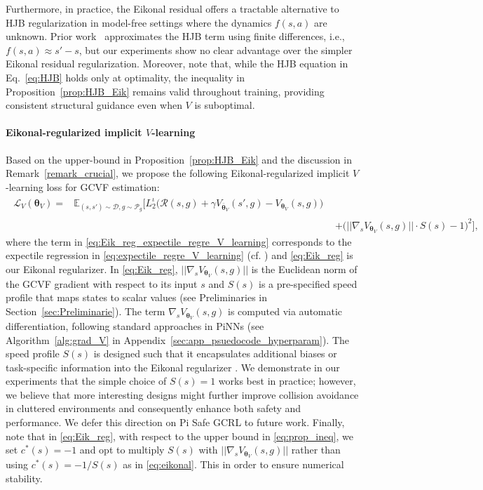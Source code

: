 \documentclass{article}
\theoremstyle{plain}
\theoremstyle{definition}
\theoremstyle{remark}
\begin{document}
Furthermore, in practice, the Eikonal residual offers a tractable alternative to HJB regularization in model-free settings where the dynamics \( f(s,a) \) are unknown. Prior work~\cite{lienenhancing} approximates the HJB term using finite differences, i.e., \( f(s,a) \approx s' - s \), but our experiments show no clear advantage over the simpler Eikonal residual regularization. Moreover, note that, while the HJB equation in Eq.~\eqref{eq:HJB} holds only at optimality, the inequality in Proposition~\ref{prop:HJB_Eik} remains valid throughout training, providing consistent structural guidance even when \( V \) is suboptimal.


\vspace{-0.1cm}
\paragraph{Eikonal-regularized implicit $V$-learning}
Based on the upper-bound in Proposition~\ref{prop:HJB_Eik} and the discussion in Remark~\ref{remark_crucial}, we propose the following Eikonal-regularized implicit $V$-learning loss for GCVF estimation: 
\begin{align}
    \begin{split}
        \mathcal{L}_V(\bm{\theta}_V) =& \mathbb{E}_{(s,s') \sim \mathcal{D}, g \sim \mathcal{P}_g}\Big[L_2^{\iota}\big(\mathcal{R}(s,g) + \gamma V_{\bar{\bm{\theta}}_V} (s', g) - V_{\bm{\theta}_V}(s, g)\big) 
    \end{split}\label{eq:Eik_reg_expectile_regre_V_learning} \\ 
    &+ \big(||\nabla_s V_{\bm{\theta}_V}(s, g)|| \cdot S(s) - 1\big)^2\Big],
    \label{eq:Eik_reg}
\end{align}
where the term in \eqref{eq:Eik_reg_expectile_regre_V_learning} corresponds to the expectile regression in \eqref{eq:expectile_regre_V_learning} (cf. \cite{park2024hiql}) and \eqref{eq:Eik_reg} is our Eikonal regularizer. In \eqref{eq:Eik_reg}, $||\nabla_s V_{\bm{\theta}_V}(s, g)||$ is the Euclidean norm of the GCVF gradient with respect to its input $s$ and $S(s)$ is a pre-specified speed profile that maps states to scalar values (see Preliminaries in Section~\ref{sec:Preliminarie}). The term $\nabla_s V_{\bm{\theta}_V}(s, g)$ is computed via automatic differentiation, following standard approaches in PiNNs (see Algorithm~\ref{alg:grad_V} in Appendix~\ref{sec:app_psuedocode_hyperparam}). The speed profile $S(s)$ is designed such that it encapsulates additional biases or task-specific information into the Eikonal regularizer \cite{nintfields}. We demonstrate in our experiments that the simple choice of $S(s)=1$ works best in practice; however, we believe that more interesting designs might further improve collision avoidance in cluttered environments and consequently enhance both safety and performance. We defer this direction on Pi Safe GCRL to future work. Finally, note that in \eqref{eq:Eik_reg}, with respect to the upper bound in \eqref{eq:prop_ineq}, we set $c^*(s) = -1$ and opt to multiply $S(s)$ with $||\nabla_s V_{\bm{\theta}_V}(s, g)||$ rather than using $c^*(s) = -1/S(s)$ as in \eqref{eq:eikonal}. This in order to ensure numerical stability. 
\end{document}
